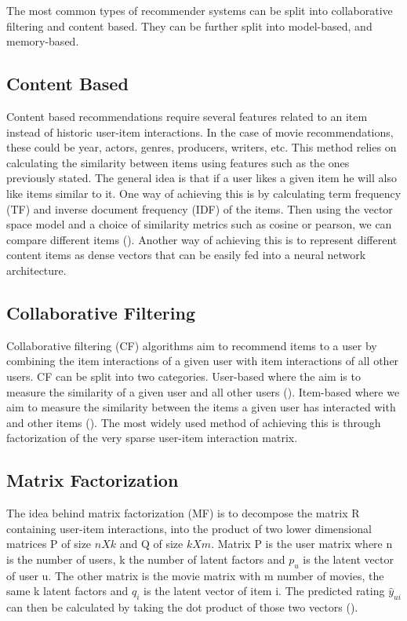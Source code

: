 The most common types of recommender systems can be split into collaborative filtering and content based. They can be further split into model-based, and memory-based.

\subsection{Content Based}
Content based recommendations require several features related to an item instead of historic user-item interactions. In the case of movie recommendations, these could be year, actors, genres, producers, writers, etc.
This method relies on calculating the similarity between items using features such as the ones previously stated.
The general idea is that if a user likes a given item he will also like items similar to it. One way of achieving this is by calculating term frequency (TF) and inverse document frequency (IDF) of the items. Then using the vector space model and a choice of similarity metrics such as cosine or pearson, we can compare different items (\citet{contentrs}).
Another way of achieving this is to represent different content items as dense vectors that can be easily fed into a neural network architecture.

\subsection{Collaborative Filtering}
Collaborative filtering (CF) algorithms aim to recommend items to a user by combining the item interactions of a given user with item interactions of all other users. CF can be split into two categories. User-based where the aim is to measure the similarity of a given user and all other users (\citet{usercf}). Item-based where we aim to measure the similarity between the items a given user has interacted with and other items (\citet{itemcf}).
The most widely used method of achieving this is through factorization of the very sparse user-item interaction matrix.

\subsection{Matrix Factorization}
The idea behind matrix factorization (MF) is to decompose the matrix R containing user-item interactions, into the product of two lower dimensional matrices P of size \(n X k\) and Q of size \(k X m\). Matrix P is the user matrix where n is the number of users, k the number of latent factors and \(p_u\) is the latent vector of user u. The other matrix is the movie matrix with m number of movies, the same k latent factors and \(q_i\) is the latent vector of item i. The predicted rating \(\hat{y}_{ui}\) can then be calculated by taking the dot product of those two vectors (\citet{MF_Techniques}).


